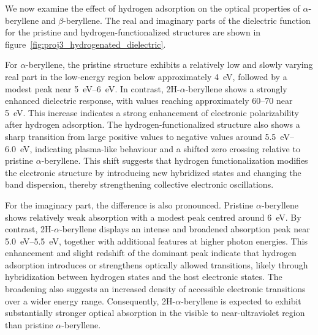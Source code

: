 We now examine the effect of hydrogen adsorption on the optical properties of $\alpha$-beryllene and $\beta$-beryllene.
The real and imaginary parts of the dielectric function for the pristine and hydrogen-functionalized structures are shown in figure~\ref{fig:proj3_hydrogenated_dielectric}.

For $\alpha$-beryllene,
the pristine structure exhibits a relatively low and slowly varying real part in the low-energy region below approximately \qty{4}{\electronvolt},
followed by a modest peak near \qtyrange{5}{6}{\electronvolt}.
In contrast,
2H-$\alpha$-beryllene shows a strongly enhanced dielectric response,
with values reaching approximately 60--70 near \qty{5}{\electronvolt}.
This increase indicates a strong enhancement of electronic polarizability after hydrogen adsorption.
The hydrogen-functionalized structure also shows a sharp transition from large positive values to negative values around \qtyrange{5.5}{6.0}{\electronvolt},
indicating plasma-like behaviour and a shifted zero crossing relative to pristine $\alpha$-beryllene.
This shift suggests that hydrogen functionalization modifies the electronic structure by introducing new hybridized states and changing the band dispersion,
thereby strengthening collective electronic oscillations.

For the imaginary part,
the difference is also pronounced.
Pristine $\alpha$-beryllene shows relatively weak absorption with a modest peak centred around \qty{6}{\electronvolt}.
By contrast,
2H-$\alpha$-beryllene displays an intense and broadened absorption peak near \qtyrange{5.0}{5.5}{\electronvolt},
together with additional features at higher photon energies.
This enhancement and slight redshift of the dominant peak indicate that hydrogen adsorption introduces or strengthens optically allowed transitions,
likely through hybridization between hydrogen states and the host electronic states.
The broadening also suggests an increased density of accessible electronic transitions over a wider energy range.
Consequently,
2H-$\alpha$-beryllene is expected to exhibit substantially stronger optical absorption in the visible to near-ultraviolet region than pristine $\alpha$-beryllene.

